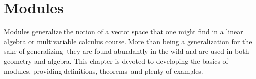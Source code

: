 \begingroup
    \ifcsname\PATH\endcsname
        \newcommand{\PATH}{books/Algebra/Modules_and_Vector_Spaces}
        \newcommand{\OLDPATH}{\PATH}
    \else
        \newcommand{\OLDPATH}{\PATH}
        \renewcommand{\PATH}{books/Algebra/Modules_and_Vector_Spaces}
    \fi
    \chapter{Modules}
        Modules generalize the notion of a vector space that one might find in a
        linear algebra or multivariable calculus course. More than being
        a generalization for the sake of generalizing, they are found
        abundantly in the wild and are used in both geometry and algebra. This
        chapter is devoted to developing the basics of modules, providing
        definitions, theorems, and plenty of examples.
        

    \renewcommand{\PATH}{\OLDPATH}
\endgroup